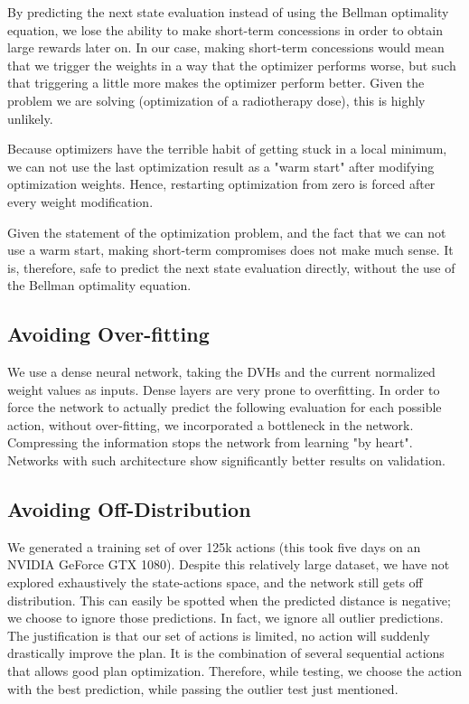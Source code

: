By predicting the next state evaluation instead of using the Bellman optimality equation, we lose the ability to make short-term concessions in order to obtain large rewards later on.
In our case, making short-term concessions would mean that we trigger the weights in a way that the optimizer performs worse, but such that triggering a little more makes the optimizer perform better.
Given the problem we are solving (optimization of a radiotherapy dose), this is highly unlikely.

Because optimizers have the terrible habit of getting stuck in a local minimum, we can not use the last optimization result as a "warm start" after modifying optimization weights.
Hence, restarting optimization from zero is forced after every weight modification.

Given the statement of the optimization problem, and the fact that we can not use a warm start, making short-term compromises does not make much sense.
It is, therefore, safe to predict the next state evaluation directly, without the use of the Bellman optimality equation.

\subsection{Avoiding Over-fitting}
We use a dense neural network, taking the DVHs and the current normalized weight values as inputs.
Dense layers are very prone to overfitting.
In order to force the network to actually predict the following evaluation for each possible action, without over-fitting, we incorporated a bottleneck in the network.
Compressing the information stops the network from learning "by heart".
Networks with such architecture show significantly better results on validation.

\subsection{Avoiding Off-Distribution}
We generated a training set of over 125k actions (this took five days on an NVIDIA GeForce GTX 1080).
Despite this relatively large dataset, we have not explored exhaustively the state-actions space, and the network still gets off distribution.
This can easily be spotted when the predicted distance is negative; we choose to ignore those predictions.
In fact, we ignore all outlier predictions.
The justification is that our set of actions is limited, no action will suddenly drastically improve the plan.
It is the combination of several sequential actions that allows good plan optimization.
Therefore, while testing, we choose the action with the best prediction, while passing the outlier test just mentioned.

